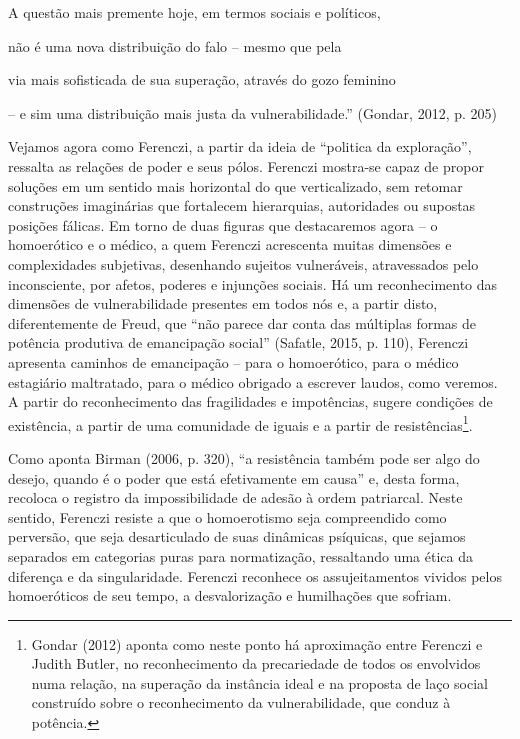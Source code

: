 A questão mais premente hoje, em termos sociais e políticos,

não é uma nova distribuição do falo -- mesmo que pela

via mais sofisticada de sua superação, através do gozo feminino

-- e sim uma distribuição mais justa da vulnerabilidade.'' (Gondar,
2012, p. 205)

Vejamos agora como Ferenczi, a partir da ideia de ``politica da
exploração'', ressalta as relações de poder e seus pólos. Ferenczi
mostra-se capaz de propor soluções em um sentido mais horizontal do que
verticalizado, sem retomar construções imaginárias que fortalecem
hierarquias, autoridades ou supostas posições fálicas. Em torno de duas
figuras que destacaremos agora -- o homoerótico e o médico, a quem
Ferenczi acrescenta muitas dimensões e complexidades subjetivas,
desenhando sujeitos vulneráveis, atravessados pelo inconsciente, por
afetos, poderes e injunções sociais. Há um reconhecimento das dimensões
de vulnerabilidade presentes em todos nós e, a partir disto,
diferentemente de Freud, que ``não parece dar conta das múltiplas formas
de potência produtiva de emancipação social'' (Safatle, 2015, p. 110),
Ferenczi apresenta caminhos de emancipação -- para o homoerótico, para o
médico estagiário maltratado, para o médico obrigado a escrever laudos,
como veremos. A partir do reconhecimento das fragilidades e impotências,
sugere condições de existência, a partir de uma comunidade de iguais e a
partir de resistências\footnote{Gondar (2012) aponta como neste ponto há
  aproximação entre Ferenczi e Judith Butler, no reconhecimento da
  precariedade de todos os envolvidos numa relação, na superação da
  instância ideal e na proposta de laço social construído sobre o
  reconhecimento da vulnerabilidade, que conduz à potência.}.

Como aponta Birman (2006, p. 320), ``a resistência também pode ser algo
do desejo, quando é o poder que está efetivamente em causa'' e, desta
forma, recoloca o registro da impossibilidade de adesão à ordem
patriarcal. Neste sentido, Ferenczi resiste a que o homoerotismo seja
compreendido como perversão, que seja desarticulado de suas dinâmicas
psíquicas, que sejamos separados em categorias puras para normatização,
ressaltando uma ética da diferença e da singularidade. Ferenczi
reconhece os assujeitamentos vividos pelos homoeróticos de seu tempo, a
desvalorização e humilhações que sofriam.

